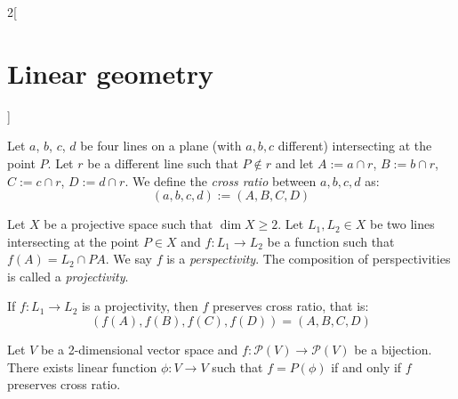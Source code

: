 \documentclass[../../../main.tex]{subfiles}
\begin{document}
\begin{multicols}{2}[\section{Linear geometry}]
  \begin{definition}
    Let $a$, $b$, $c$, $d$ be four lines on a plane (with $a,b,c$ different) intersecting at the point $P$. Let $r$ be a different line such that $P\notin r$ and let $A:=a\cap r$, $B:=b\cap r$, $C:=c\cap r$, $D:=d\cap r$. We define the \emph{cross ratio} between $a,b,c,d$ as: $$(a,b,c,d):=(A,B,C,D)$$
  \end{definition}
  \begin{definition}
    Let $X$ be a projective space such that $\dim X\geq 2$. Let $L_1,L_2\in X$ be two lines intersecting at the point $P\in X$ and $f:L_1\rightarrow L_2$ be a function such that $f(A)=L_2\cap PA$. We say $f$ is a \emph{perspectivity}. The composition of perspectivities is called a \emph{projectivity}.
  \end{definition}
  \begin{theorem}
    If $f:L_1\rightarrow L_2$ is a projectivity, then $f$ preserves cross ratio, that is: $$(f(A),f(B),f(C),f(D))=(A,B,C,D)$$
  \end{theorem}
  \begin{theorem}
    Let $V$ be a 2-dimensional vector space and $f:\mathcal{P}(V)\rightarrow \mathcal{P}(V)$ be a bijection. There exists linear function $\phi:V\rightarrow V$ such that $f=P(\phi)$ if and only if $f$ preserves cross ratio.
  \end{theorem}

\end{multicols}
\end{document}
